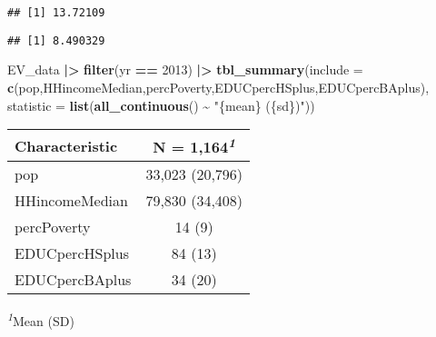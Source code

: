 \documentclass[
]{article}
\newenvironment{Shaded}{\begin{snugshade}}{\end{snugshade}}
\newcommand{\AttributeTok}[1]{\textcolor[rgb]{0.13,0.29,0.53}{#1}}
\newcommand{\DecValTok}[1]{\textcolor[rgb]{0.00,0.00,0.81}{#1}}
\newcommand{\FunctionTok}[1]{\textcolor[rgb]{0.13,0.29,0.53}{\textbf{#1}}}
\newcommand{\NormalTok}[1]{#1}
\newcommand{\SpecialCharTok}[1]{\textcolor[rgb]{0.81,0.36,0.00}{\textbf{#1}}}
\newcommand{\StringTok}[1]{\textcolor[rgb]{0.31,0.60,0.02}{#1}}
\begin{document}
\begin{Shaded}
\end{Shaded}

\begin{verbatim}
## [1] 13.72109
\end{verbatim}

\begin{Shaded}
\end{Shaded}

\begin{verbatim}
## [1] 8.490329
\end{verbatim}

\begin{Shaded}
\begin{Highlighting}[]
\NormalTok{EV\_data }\SpecialCharTok{|\textgreater{}} \FunctionTok{filter}\NormalTok{(yr }\SpecialCharTok{==} \DecValTok{2013}\NormalTok{) }\SpecialCharTok{|\textgreater{}} \FunctionTok{tbl\_summary}\NormalTok{(}\AttributeTok{include =} \FunctionTok{c}\NormalTok{(pop,HHincomeMedian,percPoverty,EDUCpercHSplus,EDUCpercBAplus),}
                       \AttributeTok{statistic =} \FunctionTok{list}\NormalTok{(}\FunctionTok{all\_continuous}\NormalTok{() }\SpecialCharTok{\textasciitilde{}} \StringTok{"\{mean\} (\{sd\})"}\NormalTok{))}
\end{Highlighting}
\end{Shaded}

\begin{table}[t]
\fontsize{12.0pt}{14.4pt}\selectfont
\begin{tabular*}{\linewidth}{@{\extracolsep{\fill}}lc}
\toprule
\textbf{Characteristic} & \textbf{N = 1,164}\textsuperscript{\textit{1}} \\ 
\midrule\addlinespace[2.5pt]
pop & 33,023 (20,796) \\ 
HHincomeMedian & 79,830 (34,408) \\ 
percPoverty & 14 (9) \\ 
EDUCpercHSplus & 84 (13) \\ 
EDUCpercBAplus & 34 (20) \\ 
\bottomrule
\end{tabular*}
\begin{minipage}{\linewidth}
\textsuperscript{\textit{1}}Mean (SD)\\
\end{minipage}
\end{table}
\end{document}
